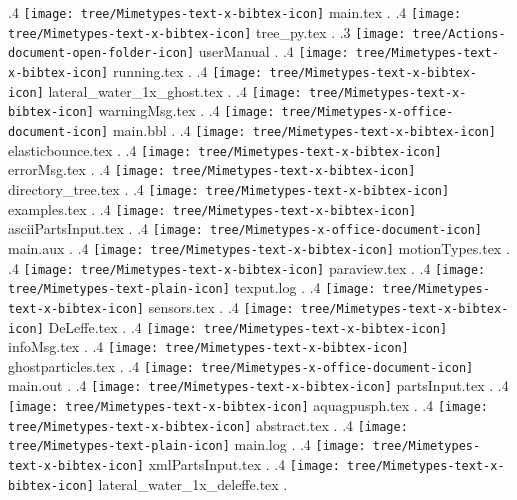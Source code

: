 {.4 { \texttt{[image: tree/Mimetypes-text-x-bibtex-icon]} main.tex }.
.4 { \texttt{[image: tree/Mimetypes-text-x-bibtex-icon]} tree\_py.tex }.
.3 { \texttt{[image: tree/Actions-document-open-folder-icon]} userManual }.
.4 { \texttt{[image: tree/Mimetypes-text-x-bibtex-icon]} running.tex }.
.4 { \texttt{[image: tree/Mimetypes-text-x-bibtex-icon]} lateral\_water\_1x\_ghost.tex }.
.4 { \texttt{[image: tree/Mimetypes-text-x-bibtex-icon]} warningMsg.tex }.
.4 { \texttt{[image: tree/Mimetypes-x-office-document-icon]} main.bbl }.
.4 { \texttt{[image: tree/Mimetypes-text-x-bibtex-icon]} elasticbounce.tex }.
.4 { \texttt{[image: tree/Mimetypes-text-x-bibtex-icon]} errorMsg.tex }.
.4 { \texttt{[image: tree/Mimetypes-text-x-bibtex-icon]} directory\_tree.tex }.
.4 { \texttt{[image: tree/Mimetypes-text-x-bibtex-icon]} examples.tex }.
.4 { \texttt{[image: tree/Mimetypes-text-x-bibtex-icon]} asciiPartsInput.tex }.
.4 { \texttt{[image: tree/Mimetypes-x-office-document-icon]} main.aux }.
.4 { \texttt{[image: tree/Mimetypes-text-x-bibtex-icon]} motionTypes.tex }.
.4 { \texttt{[image: tree/Mimetypes-text-x-bibtex-icon]} paraview.tex }.
.4 { \texttt{[image: tree/Mimetypes-text-plain-icon]} texput.log }.
.4 { \texttt{[image: tree/Mimetypes-text-x-bibtex-icon]} sensors.tex }.
.4 { \texttt{[image: tree/Mimetypes-text-x-bibtex-icon]} DeLeffe.tex }.
.4 { \texttt{[image: tree/Mimetypes-text-x-bibtex-icon]} infoMsg.tex }.
.4 { \texttt{[image: tree/Mimetypes-text-x-bibtex-icon]} ghostparticles.tex }.
.4 { \texttt{[image: tree/Mimetypes-x-office-document-icon]} main.out }.
.4 { \texttt{[image: tree/Mimetypes-text-x-bibtex-icon]} partsInput.tex }.
.4 { \texttt{[image: tree/Mimetypes-text-x-bibtex-icon]} aquagpusph.tex }.
.4 { \texttt{[image: tree/Mimetypes-text-x-bibtex-icon]} abstract.tex }.
.4 { \texttt{[image: tree/Mimetypes-text-plain-icon]} main.log }.
.4 { \texttt{[image: tree/Mimetypes-text-x-bibtex-icon]} xmlPartsInput.tex }.
.4 { \texttt{[image: tree/Mimetypes-text-x-bibtex-icon]} lateral\_water\_1x\_deleffe.tex }.
}
